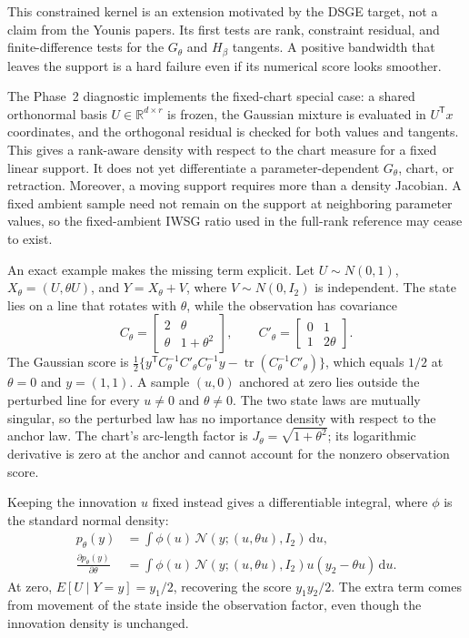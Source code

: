 \documentclass[11pt]{article}
\newcommand{\R}{\mathbb{R}}
\newcommand{\dd}{\mathrm{d}}
\begin{document}
This constrained kernel is an extension motivated by the DSGE target, not a
claim from the Younis papers.  Its first tests are rank, constraint residual,
and finite-difference tests for the $G_\theta$ and $H_\beta$ tangents.  A
positive bandwidth that leaves the support is a hard failure even if its
numerical score looks smoother.

The Phase~2 diagnostic implements the fixed-chart special case: a shared
orthonormal basis $U\in\R^{d\times r}$ is frozen, the Gaussian mixture is
evaluated in $U^\mathsf{T}x$ coordinates, and the orthogonal residual is checked
for both values and tangents.  This gives a rank-aware density with respect to
the chart measure for a fixed linear support.  It does not yet differentiate a
parameter-dependent $G_\theta$, chart, or retraction.  Moreover, a moving
support requires more than a density Jacobian.  A fixed ambient sample need
not remain on the support at neighboring parameter values, so the
fixed-ambient IWSG ratio used in the full-rank reference may cease to exist.

An exact example makes the missing term explicit.  Let $U\sim N(0,1)$,
$X_\theta=(U,\theta U)$, and $Y=X_\theta+V$, where $V\sim N(0,I_2)$ is
independent.  The state lies on a line that rotates with $\theta$, while the
observation has covariance
\begin{equation}
 C_\theta=\begin{bmatrix}2&\theta\\\theta&1+\theta^2\end{bmatrix},
 \qquad
 C'_\theta=\begin{bmatrix}0&1\\1&2\theta\end{bmatrix}.
 \label{eq:moving-support-covariance}
\end{equation}
The Gaussian score is
$\tfrac12\{y^\mathsf{T}C_\theta^{-1}C'_\theta C_\theta^{-1}y
-\operatorname{tr}(C_\theta^{-1}C'_\theta)\}$, which equals $1/2$ at
$\theta=0$ and $y=(1,1)$.  A sample $(u,0)$ anchored at zero lies outside
the perturbed line for every $u\ne0$ and $\theta\ne0$.  The two state laws
are mutually singular, so the perturbed law has no importance density with
respect to the anchor law.  The chart's arc-length factor is
$J_\theta=\sqrt{1+\theta^2}$; its logarithmic derivative is zero at the
anchor and cannot account for the nonzero observation score.

Keeping the innovation $u$ fixed instead gives a differentiable integral,
where $\phi$ is the standard normal density:
\begin{align}
 p_\theta(y)
   &=\int \phi(u)\,\mathcal N(y;(u,\theta u),I_2)\,\dd u,\\
 \frac{\partial p_\theta(y)}{\partial\theta}
   &=\int \phi(u)\,\mathcal N(y;(u,\theta u),I_2)
                 u(y_2-\theta u)\,\dd u.
 \label{eq:moving-support-score}
\end{align}
At zero, $E[U\mid Y=y]=y_1/2$, recovering the score $y_1y_2/2$.
The extra term comes from movement of the state inside the observation
factor, even though the innovation density is unchanged.
\end{document}
